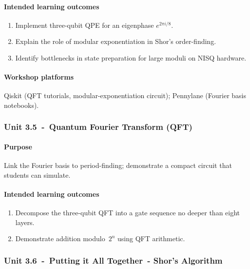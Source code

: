 \paragraph{Intended learning outcomes}
\begin{enumerate}[label=3.4-\alph*]
	\item Implement three-qubit QPE for an eigenphase $e^{2\pi i/8}$.  
	\item Explain the role of modular exponentiation in Shor’s order-finding.  
	\item Identify bottlenecks in state preparation for large moduli on NISQ hardware.                                               
\end{enumerate}

\paragraph{Workshop platforms}
Qiskit (QFT tutorials, modular-exponentiation circuit); Pennylane (Fourier basis notebooks).

\subsubsection*{Unit 3.5 - Quantum Fourier Transform (QFT)}

\paragraph{Purpose}
Link the Fourier basis to period-finding; demonstrate a compact circuit that students can simulate.

\paragraph{Intended learning outcomes}
\begin{enumerate}[label=3.5-\alph*]
	\item Decompose the three-qubit QFT into a gate sequence no deeper than eight layers.                                           
	\item Demonstrate addition modulo $2^{n}$ using QFT arithmetic.    
\end{enumerate}

\subsubsection*{Unit 3.6 - Putting it All Together - Shor’s Algorithm}

